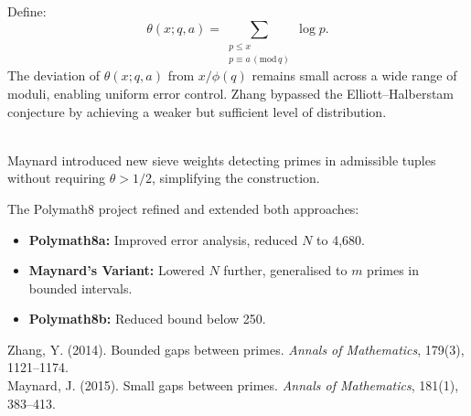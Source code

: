 \begin{technical}
Define:
\[
\theta(x; q, a) = \sum_{\substack{p \le x \\ p \equiv a \,(\mathrm{mod}\,q)}} \log p.
\]
The deviation of \( \theta(x; q, a) \) from \( x / \phi(q) \) remains small across a wide range of moduli, enabling uniform error control. Zhang bypassed the Elliott–Halberstam conjecture by achieving a weaker but sufficient level of distribution.

\vspace{0.7em}
\\[0.5em]
Maynard introduced new sieve weights detecting primes in admissible tuples without requiring \( \theta > 1/2 \), simplifying the construction.

The Polymath8 project refined and extended both approaches:
\begin{itemize}[leftmargin=*]
    \item \textbf{Polymath8a:} Improved error analysis, reduced \( N \) to 4,680.
    \item \textbf{Maynard's Variant:} Lowered \( N \) further, generalised to \( m \) primes in bounded intervals.
    \item \textbf{Polymath8b:} Reduced bound below 250.
\end{itemize}

\techref
{\footnotesize
Zhang, Y. (2014). Bounded gaps between primes. \textit{Annals of Mathematics}, 179(3), 1121–1174.\\
Maynard, J. (2015). Small gaps between primes. \textit{Annals of Mathematics}, 181(1), 383–413.
}

\end{technical}
